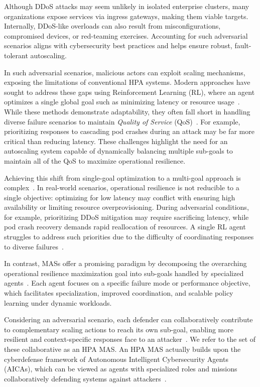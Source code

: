 \documentclass[conference]{IEEEtran}
\begin{document}
Although DDoS attacks may seem unlikely in isolated enterprise clusters, many organizations expose services via ingress gateways, making them viable targets. Internally, DDoS-like overloads can also result from misconfigurations, compromised devices, or red-teaming exercises. Accounting for such adversarial scenarios aligns with cybersecurity best practices and helps ensure robust, fault-tolerant autoscaling.

In such adversarial scenarios, malicious actors can exploit scaling mechanisms, exposing the limitations of conventional HPA systems. Modern approaches have sought to address these gaps using Reinforcement Learning (RL), where an agent optimizes a single global goal such as minimizing latency or resource usage~\cite{Gari2021}. While these methods demonstrate adaptability, they often fall short in handling diverse failure scenarios to maintain \textit{Quality of Service} (QoS)~\cite{Liu2024}. For example, prioritizing responses to cascading pod crashes during an attack may be far more critical than reducing latency. These challenges highlight the need for an autoscaling system capable of dynamically balancing multiple sub-goals to maintain all of the QoS to maximize operational resilience.

Achieving this shift from single-goal optimization to a multi-goal approach is complex~\cite{Shoham2009MAS}. In real-world scenarios, operational resilience is not reducible to a single objective: optimizing for low latency may conflict with ensuring high availability or limiting resource overprovisioning. During adversarial conditions, for example, prioritizing DDoS mitigation may require sacrificing latency, while pod crash recovery demands rapid reallocation of resources. A single RL agent struggles to address such priorities due to the difficulty of coordinating responses to diverse failures~\cite{Jennings1998}.

In contrast, MASs offer a promising paradigm by decomposing the overarching operational resilience maximization goal into sub-goals handled by specialized agents~\cite{Shoham2009MAS}. Each agent focuses on a specific failure mode or performance objective, which facilitates specialization, improved coordination, and scalable policy learning under dynamic workloads.

Considering an adversarial scenario, each defender can collaboratively contribute to complementary scaling actions to reach its own sub-goal, enabling more resilient and context-specific responses face to an attacker~\cite{Jennings1998}. We refer to the set of these collaborative as an HPA MAS. An HPA MAS actually builds upon the cyberdefense framework of Autonomous Intelligent Cybersecurity Agents (AICAs), which can be viewed as agents with specialized roles and missions collaboratively defending systems against attackers~\cite{Kott2018}.
\end{document}

